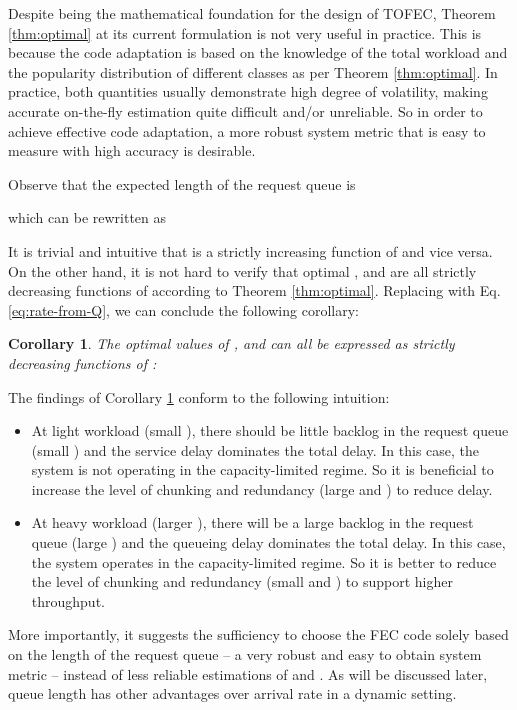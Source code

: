 \documentclass[journal]{IEEEtran}
\newcommand{\ourproposal}{TOFEC\xspace}
\newtheorem{corollary}{\textbf{Corollary}}
\begin{document}
Despite being the mathematical foundation for the design of \ourproposal, Theorem \ref{thm:optimal} at its current formulation is not very useful in practice. This is because the code adaptation is based on the knowledge of the total workload  and  the popularity distribution of different classes  as per Theorem \ref{thm:optimal}. In practice, both quantities usually demonstrate high degree of volatility, making accurate on-the-fly estimation quite difficult and/or unreliable. So in order to achieve effective code adaptation, a more robust system metric that is easy to measure with high accuracy is desirable. 

Observe that the expected length of the request queue is

which can be rewritten as

It is trivial and intuitive that  is a strictly increasing function of  and vice versa. On the other hand, it is not hard to verify that optimal ,  and  are all strictly decreasing functions of  according to Theorem \ref{thm:optimal}. 
Replacing  with Eq.\ref{eq:rate-from-Q}, we can conclude the following corollary:
\begin{corollary}
\label{corr:func_of_Q}
The optimal values of ,  and  can all be expressed as strictly decreasing functions of :

\end{corollary}


The findings of Corollary \ref{corr:func_of_Q} conform to the following intuition: 
\begin{itemize}
\item At light workload (small ), there should be little backlog in the request queue (small ) and the service delay dominates the total delay. In this case, the system is not operating in the capacity-limited regime. So it is beneficial to increase the level of chunking and redundancy (large  and ) to reduce delay.

\item At heavy workload (larger ), there will be a large backlog in the request queue (large ) and the queueing delay dominates the total delay. In this case, the system operates in the capacity-limited regime. So it is better to reduce the level of chunking and redundancy (small  and ) to support higher throughput.
\end{itemize}
More importantly, it suggests the sufficiency to choose the FEC code solely based on the length of the request queue -- a very robust and easy to obtain system metric -- instead of less reliable estimations of  and . As will be discussed later, queue length has other advantages over arrival rate in a dynamic setting.
\end{document}
